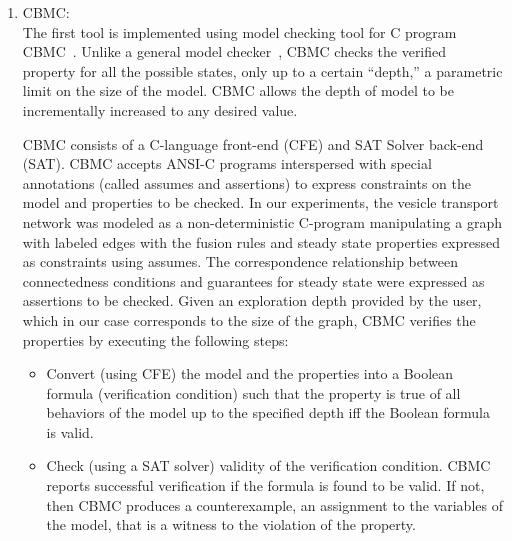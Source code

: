 \begin{enumerate}
  \item CBMC: \\
The first tool is implemented using model checking tool for C program CBMC~\cite{clarke2004tool}.
%
Unlike a general model checker~\cite{cimatti2002nusmv}, CBMC checks the verified property for all the possible states, only up to a certain “depth,” a parametric limit on the size of the model.
%
CBMC allows the depth of model to be incrementally increased to any desired value.

CBMC consists of a C-language front-end (CFE) and SAT Solver back-end (SAT).
%
CBMC accepts ANSI-C programs interspersed with special annotations (called assumes and assertions) to express constraints on the model and properties to be checked. 
%		
In our experiments, the vesicle transport network was modeled as a non-deterministic C-program manipulating a graph with labeled edges with the fusion rules and steady state properties expressed as constraints
using assumes. 
%		
The correspondence relationship between connectedness conditions
and guarantees for steady state were expressed as assertions to be checked. 
%		
Given an exploration depth provided by the user, which in our case corresponds to the size of the graph, CBMC verifies the properties by executing the following steps:
	\begin{itemize}
	\item Convert (using CFE) the model and the properties into a Boolean formula (verification condition) such that the property is true of all behaviors of the model up to the specified
depth iff the Boolean formula is valid.
	\item Check (using a SAT solver) validity of the verification condition. CBMC reports successful verification if the formula is found to be valid. If not, then CBMC produces a counterexample,
an assignment to the variables of the model, that is a witness to the violation of the property.
	\end{itemize}


\end{enumerate}
